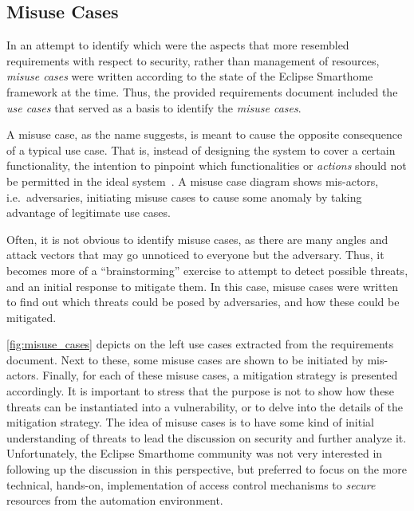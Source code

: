 \documentclass[12pt]{article}
\begin{document}
\subsection{Misuse Cases}

In an attempt to identify which were the aspects that more resembled requirements with respect to security, rather than management of resources, \emph{misuse cases} were written according to the state of the Eclipse Smarthome framework at the time. Thus, the provided requirements document included the \emph{use cases} that served as a basis to identify the \emph{misuse cases}. 

A misuse case, as the name suggests, is meant to cause the opposite consequence of a typical use case. That is, instead of designing the system to cover a certain functionality, the intention to pinpoint which functionalities or \emph{actions} should not be permitted in the ideal system~\cite{misuse}. A misuse case diagram shows mis-actors, i.e.\ adversaries, initiating misuse cases to cause some anomaly by taking advantage of legitimate use cases.

Often, it is not obvious to identify misuse cases, as there are many angles and attack vectors that may go unnoticed to everyone but the adversary. Thus, it becomes more of a ``brainstorming'' exercise to attempt to detect possible threats, and an initial response to mitigate them. In this case, misuse cases were written to find out which threats could be posed by adversaries, and how these could be mitigated.

\autoref{fig:misuse_cases} depicts on the left use cases extracted from the requirements document. Next to these, some misuse cases are shown to be initiated by mis-actors. Finally, for each of these misuse cases, a mitigation strategy is presented accordingly. It is important to stress that the purpose is not to show how these threats can be instantiated into a vulnerability, or to delve into the details of the mitigation strategy. The idea of misuse cases is to have some kind of initial understanding of threats to lead the discussion on security and further analyze it. Unfortunately, the Eclipse Smarthome community was not very interested in following up the discussion in this perspective, but preferred to focus on the more technical, hands-on, implementation of access control mechanisms to \emph{secure} resources from the automation environment.
\end{document}
